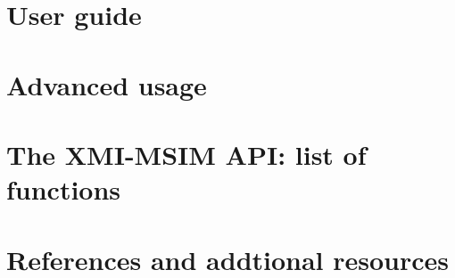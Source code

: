 \documentclass[11pt,a4paper,oneside,titlepage]{article}
\begin{document}
\section{User guide}\label{User-guide}

\section{Advanced usage}\label{Advanced-usage}


\section{The XMI-MSIM API: list of functions}\label{The-XMI-MSIM-API-list-of-functions}

\section{References and addtional resources}\label{References-and-additional-resources}

\end{document}
